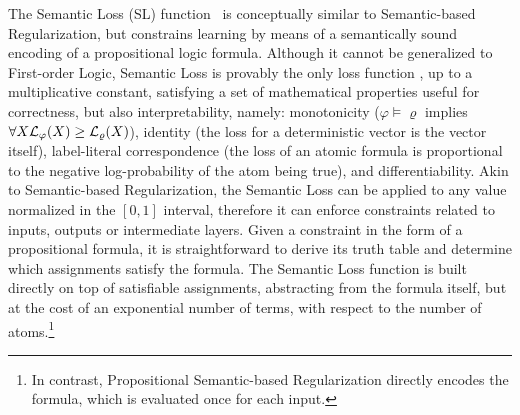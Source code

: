The Semantic Loss (SL) function~\cite{xu2018semantic} is conceptually similar to Semantic-based Regularization, but constrains learning by means of a semantically sound encoding of a propositional logic formula. Although it cannot be generalized to First-order Logic, Semantic Loss is provably the only loss function , up to a multiplicative constant, satisfying a set of mathematical properties useful for correctness, but also interpretability, namely: monotonicity ($\varphi \models \varrho$ implies $\forall X {\mathcal{L}}_\varphi(X) \geq {\mathcal{L}}_\varrho(X)$), identity (the loss for a deterministic vector is the vector itself), label-literal correspondence (the loss of an atomic formula is proportional to the negative log-probability of the atom being true), and differentiability.
Akin to Semantic-based Regularization, the Semantic Loss can be applied to any value normalized in the $[0, 1]$ interval, therefore it can enforce constraints related to inputs, outputs or intermediate layers.
Given a constraint in the form of a propositional formula, it is straightforward to derive its truth table and determine which assignments satisfy the formula. The Semantic Loss function is built directly on top of satisfiable assignments, abstracting from the formula itself, but at the cost of an exponential number of terms, with respect to the number of atoms.\footnote{In contrast, Propositional Semantic-based Regularization directly encodes the formula, which is evaluated once for each input.}

